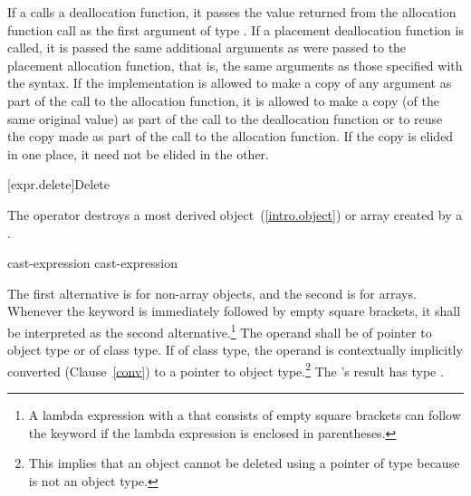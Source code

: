 \pnum
If a  calls a deallocation function, it passes
the value returned from the allocation function call as the first
argument of type . If a placement deallocation function is
called, it is passed the same additional arguments as were passed to the
placement allocation function, that is, the same arguments as those
specified with the  syntax. If the
implementation is allowed to make a copy of any argument as part of the
call to the allocation function, it is allowed to make a copy (of the
same original value) as part of the call to the deallocation function or
to reuse the copy made as part of the call to the allocation function.
If the copy is elided in one place, it need not be elided in the other.

[expr.delete]{Delete}

\pnum
{}%
%
The  operator destroys a most derived
object~(\ref{intro.object}) or array created by a
.

\begin{bnf}
\br
    \terminal{::}\opt{}  cast-expression\br
    \terminal{::}\opt{}  cast-expression
\end{bnf}

The first alternative is for non-array objects, and the second is for arrays. Whenever
the  keyword is immediately followed by empty square brackets, it shall be
interpreted as the second alternative.\footnote{A lambda expression with a
 that consists of
empty square brackets can follow the  keyword if the lambda expression is
enclosed in parentheses.}
The operand shall be of pointer to object type or of class type. If of
class type, the operand is contextually implicitly converted
(Clause~\ref{conv}) to a pointer to object
type.\footnote{This implies that an object
cannot be deleted using a pointer of type
 because  is not an object type.}
The 's result has type
.

